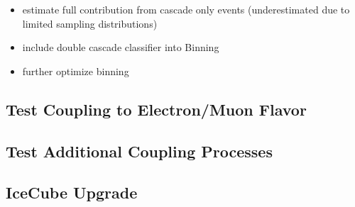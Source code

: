 \begin{itemize}
    \item estimate full contribution from cascade only events (underestimated due to limited sampling distributions)
    \item include double cascade classifier into Binning
    \item further optimize binning
\end{itemize}

\subsection{Test Coupling to Electron/Muon Flavor}

\subsection{Test Additional Coupling Processes}

\subsection{IceCube Upgrade}
